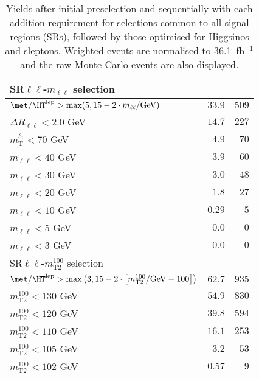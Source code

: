 \begin{table}
\begin{center}
\begin{tabular*}{\textwidth}{@{\extracolsep{\fill}}lrr}
\midrule
SR$\ell\ell$-$m_{\ell\ell}$ selection & \\ 
\midrule
$\met / \HT^\text{lep} > \text{max}(5, 15-2\cdot m_{\ell\ell}/\text{GeV})$ & $33.9$ & $509$   \\ 
    $\Delta R_{\ell\ell} < 2.0$ GeV & $14.7$ & $227$   \\ 
    $m_\text{T}^{\ell_1} < 70$ GeV & $4.9$ & $70$   \\ 
    $m_{\ell\ell} < 40$ GeV & $3.9$ & $60$   \\ 
    $m_{\ell\ell} < 30$ GeV & $3.0$ & $48$   \\ 
    $m_{\ell\ell} < 20$ GeV & $1.8$ & $27$   \\ 
    $m_{\ell\ell} < 10$ GeV & $0.29$ & $5$   \\ 
    $m_{\ell\ell} < 5$ GeV & $0.0$ & $0$   \\ 
    $m_{\ell\ell} < 3$ GeV & $0.0$ & $0$   \\ 
    \midrule
SR$\ell\ell$-$m_\text{T2}^{100}$ selection & \\ 
\midrule
$\met / \HT^\text{lep} > \text{max}\left(3, 15-2\cdot \left[m_\text{T2}^{100}/\text{GeV} - 100\right]\right)$ & $62.7$ & $935$   \\ 
    $m_\text{T2}^{100} < 130$ GeV & $54.9$ & $830$   \\ 
    $m_\text{T2}^{100} < 120$ GeV & $39.8$ & $594$   \\ 
    $m_\text{T2}^{100} < 110$ GeV & $16.1$ & $253$   \\ 
    $m_\text{T2}^{100} < 105$ GeV & $3.2$ & $53$   \\ 
    $m_\text{T2}^{100} < 102$ GeV & $0.57$ & $9$   \\ 
    
  \bottomrule
  \end{tabular*}
\end{center}
\caption{ Yields after initial preselection and sequentially with each addition requirement 
for selections common to all signal regions (SRs), 
followed by those optimised for Higgsinos and sleptons. 
Weighted events are normalised to 36.1~fb$^{-1}$ and the raw Monte Carlo events are also displayed.
}
\label{tab:cutflow_top}
\end{table} 
  